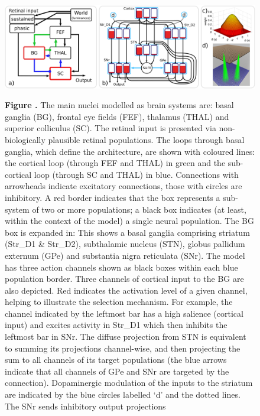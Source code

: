 \documentclass{frontiersSCNS}
\begin{document}
\begin{figure}[t]
\begin{center}
\includegraphics[width=\textwidth]{./figures/ccg_model.png}
\end{center}
\textbf{\label{fig:ccg_model} Figure .}
{  The main
nuclei modelled as brain systems are: basal ganglia (BG), frontal eye
fields (FEF), thalamus (THAL) and superior colliculus (SC). The
retinal input is presented via non-biologically plausible retinal
populations. The loops through basal ganglia, which define the
architecture, are shown with coloured lines: the cortical loop
(through FEF and THAL) in green and the sub-cortical loop (through SC
and THAL) in blue. Connections with arrowheads indicate excitatory
connections, those with circles are inhibitory. A red border indicates
that the box represents a sub-system of two or more populations; a
black box indicates (at least, within the context of the model) a
single neural population. The BG box is expanded in: 
%
This shows a basal ganglia comprising striatum (Str\_D1 \& Str\_D2),
subthalamic nucleus (STN), globus pallidum externum (GPe) and
substantia nigra reticulata (SNr). The model has three action channels
shown as black boxes within each blue population border. Three
channels of cortical input to the BG are also depicted. Red indicates
the activation level of a given channel, helping to illustrate the
selection mechanism. For example, the channel indicated by the
leftmost bar has a high salience (cortical input) and excites activity
in Str\_D1 which then inhibits the leftmost bar in SNr. The diffuse
projection from STN is equivalent to summing its projections
channel-wise, and then projecting the sum to all channels of its
target populations (the blue arrows indicate that all channels of GPe
and SNr are targeted by the connection). Dopaminergic modulation of
the inputs to the striatum are indicated by the blue circles labelled
`d' and the dotted lines. The SNr sends inhibitory output projections
}
\end{figure}
\end{document}
